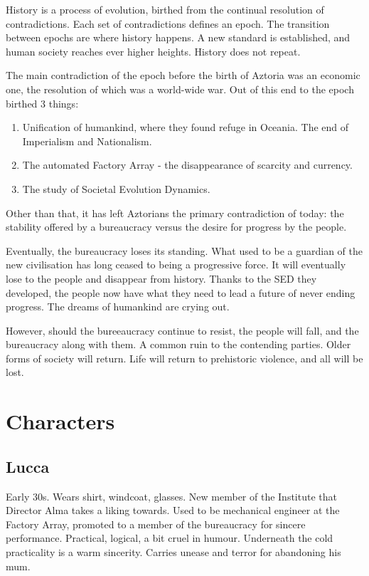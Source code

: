 \documentclass[11pt]{article}
\begin{document}
	History is a process of evolution, birthed from the continual resolution of contradictions. 
	Each set of contradictions defines an epoch.
	The transition between epochs are where history happens.
	A new standard is established, and human society reaches ever higher heights. History does not repeat.
	
	The main contradiction of the epoch before the birth of Aztoria was an economic one, the resolution of which was a world-wide war.
	Out of this end to the epoch birthed 3 things:
	
	\begin{enumerate}
		\item Unification of humankind, where they found refuge in Oceania. The end of Imperialism and Nationalism.
		\item The automated Factory Array - the disappearance of scarcity and currency.
		\item The study of Societal Evolution Dynamics.
	\end{enumerate}
	
	Other than that, it has left Aztorians the primary contradiction of today: the stability offered by a bureaucracy versus the desire for progress by the people.
	
	Eventually, the bureaucracy loses its standing. 
	What used to be a guardian of the new civilisation has long ceased to being a progressive force. 
	It will eventually lose to the people and disappear from history. 
	Thanks to the SED they developed, the people now have what they need to lead a future of never ending progress.
	The dreams of humankind are crying out.
	
	However, should the bureeaucracy continue to resist, the people will fall, and the bureaucracy along with them. 
	A common ruin to the contending parties.
	Older forms of society will return. 
	Life will return to prehistoric violence, and all will be lost.
\newpage






\section{Characters}
	\subsection{Lucca}
	Early 30s. Wears shirt, windcoat, glasses.
	New member of the Institute that Director Alma takes a liking towards.
	Used to be mechanical engineer at the Factory Array, promoted to a member of the bureaucracy for sincere performance.
	Practical, logical, a bit cruel in humour. 
	Underneath the cold practicality is a warm sincerity.
	Carries unease and terror for abandoning his mum.
\end{document}
